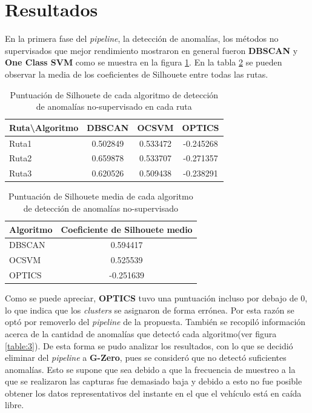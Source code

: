 \section{Resultados}
	En la primera fase del \emph{pipeline}, la detección de anomalías, los métodos no supervisados que mejor rendimiento mostraron en general fueron
	\textbf{DBSCAN} y \textbf{One Class SVM} como se muestra en la figura \ref{table:1}. En la tabla \ref{table:2} se pueden observar la media
	de los coeficientes de Silhouete entre todas las rutas.

	\begin{table}[htb]
		\centering
		\caption{Puntuación de Silhouete de cada algoritmo de detección de anomalías no-supervisado en cada ruta}
		\label{table:1}
		\begin{tabular}{lccc}
		\toprule
		  Ruta\textbackslash Algoritmo &    DBSCAN &     OCSVM &     OPTICS \\
		\midrule
		  Ruta1 &  0.502849 &  0.533472 &  -0.245268 \\
		  Ruta2 &  0.659878 &  0.533707 &  -0.271357 \\
		  Ruta3 &  0.620526 &  0.509438 &  -0.238291 \\
		\bottomrule
		\end{tabular}
		
	\end{table}

	\begin{table}[htb]
		\centering
		\caption{Puntuación de Silhouete media de cada algoritmo de detección de anomalías no-supervisado}
		\label{table:2}
		\begin{tabular}{lc}
		\toprule
		Algoritmo & Coeficiente de Silhouete medio \\
		\midrule
		   DBSCAN &   0.594417 	\\
		    OCSVM &   0.525539 	\\
		   OPTICS &  -0.251639 	\\
		\bottomrule
		\end{tabular}
		
	\end{table}

	Como se puede apreciar, \textbf{OPTICS} tuvo una puntuación incluso por debajo de 0, lo que indica que los \emph{clusters} se asignaron de 
	forma errónea. Por esta razón se optó por removerlo del \emph{pipeline} de la propuesta. También se recopiló información acerca de la
	cantidad de anomalías que detectó cada algoritmo(ver figura \ref{table:3}). De esta forma se pudo analizar los resultados, con lo que se decidió eliminar del \emph
	{pipeline} a \textbf{G-Zero}, pues se consideró que no detectó suficientes anomalías. Esto se supone que sea debido a que la frecuencia de
	muestreo a la que se realizaron las capturas fue demasiado baja y debido a esto no fue posible obtener los datos representativos del
	instante en el que el vehículo está en caída libre.

